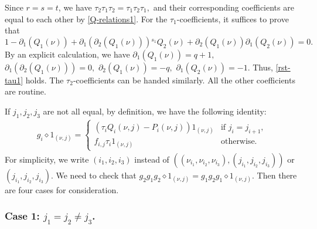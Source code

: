 \documentclass[11pt, reqno]{amsart} \textwidth=14.9cm \oddsidemargin=1cm \evensidemargin=1cm
\theoremstyle{definition}
\numberwithin{equation}{section}
\begin{document}
Since $r=s=t$, we have $\tau_2\tau_1\tau_2=\tau_1\tau_2\tau_1,$ and their corresponding coefficients are equal to each other
by \eqref{Q-relations1}. For the $\tau_1$-coefficients, it suffices to prove that
\begin{equation}
1-\partial_{1}(Q_1(\nu))+\partial_{1}(\partial_{2}(Q_1(\nu))){}^{s_{1}}Q_2(\nu)+\partial_{2}(Q_1(\nu))\partial_{1}(Q_2(\nu))=0.\label{rst-tau1}
\end{equation}
By an explicit calculation, we have $\partial_{1}(Q_1(\nu))=q+1,$ $\partial_{1}(\partial_{2}(Q_1(\nu)))=0,$ $\partial_{2}(Q_1(\nu))=-q,$ $\partial_{1}(Q_2(\nu))=-1.$ Thus, \eqref{rst-tau1} holds. The $\tau_2$-coefficients can be handed similarly. All the other coefficients are routine.

If $j_1, j_2, j_3$ are not all equal, by definition, we have the following identity:
\begin{align*}
g_{i}\diamond 1_{(\nu, j)}=\left\{
\begin{array}{ll}
(\tau_{i}Q_{i}(\nu, j)-P_{i}(\nu, j))1_{(\nu, j)}&\text{if $j_{i}=j_{i+1}$},\\[0.3em]
f_{i, j}\tau_{i}1_{(\nu, j)}&\text{otherwise.}
\end{array}
\right.
\end{align*}
For simplicity, we write $(i_1, i_2, i_3)$ instead of $((\nu_{i_1}, \nu_{i_2}, \nu_{i_3}),(j_{i_1}, j_{i_2}, j_{i_3}))$ or $(j_{i_1}, j_{i_2}, j_{i_3}).$ We need to check that $g_{2}g_{1}g_{2}\diamond 1_{(\nu, j)}=g_{1}g_{2}g_{1}\diamond 1_{(\nu, j)}.$ Then there are four cases for consideration.

\subsubsection*{Case 1: $j_1=j_2\neq j_3$.}

\
\end{document}
